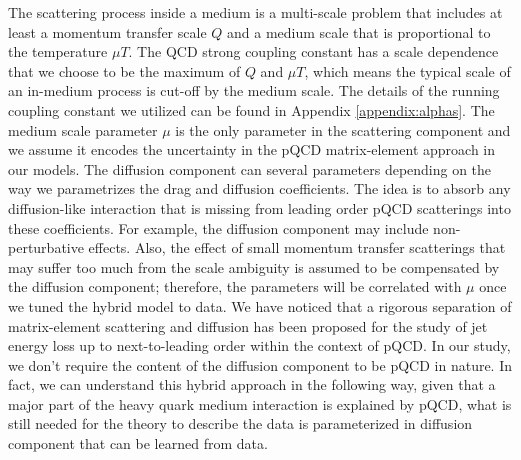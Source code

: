\documentclass[aps, prc, reprint, amsmath, groupedaddress, nofootinbib]{revtex4-1}
\begin{document}
The scattering process inside a medium is a multi-scale problem that includes at least a momentum transfer scale $Q$ and a medium scale that is proportional to the temperature $\mu T$.
The QCD strong coupling constant has a scale dependence that we choose to be the maximum of $Q$ and $\mu T$, which means the typical scale of an in-medium process is cut-off by the medium scale.
The details of the running coupling constant we utilized can be found in Appendix \ref{appendix:alphas}.
The medium scale parameter $\mu$ is the only parameter in the scattering component and we assume it encodes the uncertainty in the pQCD matrix-element approach in our models.
The diffusion component can several parameters depending on the way we parametrizes the drag and diffusion coefficients. 
The idea is to absorb any diffusion-like interaction that is missing from leading order pQCD scatterings into these coefficients.
For example, the diffusion component may include non-perturbative effects.
Also, the effect of small momentum transfer scatterings that may suffer too much from the scale ambiguity is assumed to be compensated by the diffusion component; therefore, the parameters will be correlated with $\mu$ once we tuned the hybrid model to data.
We have noticed that a rigorous separation of matrix-element scattering and diffusion has been proposed for the study of jet energy loss up to next-to-leading order within the context of pQCD.
In our study, we don't require the content of the diffusion component to be pQCD in nature.
In fact, we can understand this hybrid approach in the following way, given that a major part of the heavy quark medium interaction is explained by pQCD, what is still needed for the theory to describe the data is parameterized in diffusion component that can be learned from data.
\end{document}
